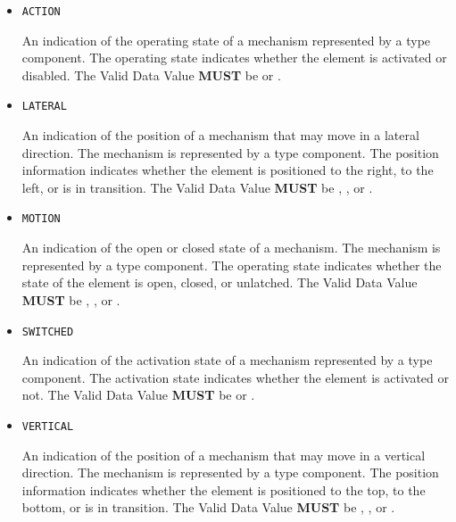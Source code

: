 \begin{itemize}

\item \texttt{ACTION}


An indication of the operating state of a mechanism represented by a  type component.
 The operating state indicates whether the  element is activated or disabled. 
 The \gls{Valid Data Value} \textbf{MUST} be  or .

\item \texttt{LATERAL}


An indication of the position of a mechanism that may move in a lateral direction.   The mechanism is represented by a  type component. 
 The position information indicates whether the  element is positioned to the right, to the left, or is in transition.  
 The \gls{Valid Data Value} \textbf{MUST} be , , or .

\item \texttt{MOTION}


An indication of the open or closed state of a mechanism.   The mechanism is represented by a  type component. 
 The operating state indicates whether the state of the  element is open, closed, or unlatched.   
 The \gls{Valid Data Value} \textbf{MUST} be , , or .

\item \texttt{SWITCHED}


An indication of the activation state of a mechanism represented by a  type component.
 The activation state indicates whether the  element is activated or not.
 The \gls{Valid Data Value} \textbf{MUST} be  or .

\item \texttt{VERTICAL}


An indication of the position of a mechanism that may move in a vertical direction. The mechanism is represented by a  type component. 
 The position information indicates whether the  element is positioned to the top, to the bottom, or is in transition.  
 The \gls{Valid Data Value} \textbf{MUST} be , , or .


\end{itemize}


